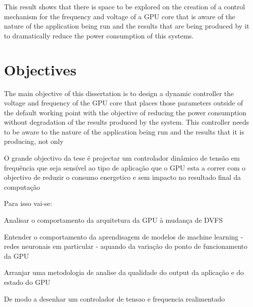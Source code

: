 This result shows that there is space to be explored on the creation of a control mechanism for the frequency and voltage of a GPU core that is aware of the nature of the application being run and the results that are being produced by it to dramatically reduce the power consumption of this systems.

\section{Objectives}
\label{section:objectives}

The main objective of this dissertation is to design a dynamic controller the voltage and frequency of the GPU core that places those parameters outside of the default working point with the objective of reducing the power consumption without degradation of the results produced by the system. This controller needs to be aware to the nature of the application being run and the results that it is producing, not only 

O grande objectivo da tese é projectar um controlador dinâmico de tensão em frequência que seja sensível ao tipo de aplicação que o GPU esta a correr com o objectivo de reduzir o consumo energetico e sem impacto no resultado final da computação

Para isso vai-se:

Analisar o comportamento da arquitetura da GPU à mudança de DVFS

Entender o comportamento da aprendisagem de modelos de machine learning - redes neuronais em particular - aquando da variação do ponto de funcionamento da GPU

Arranjar uma metodologia de analise da qualidade do output da aplicação e do estado do GPU

De modo a desenhar um controlador de tensao e frequencia realimentado 

